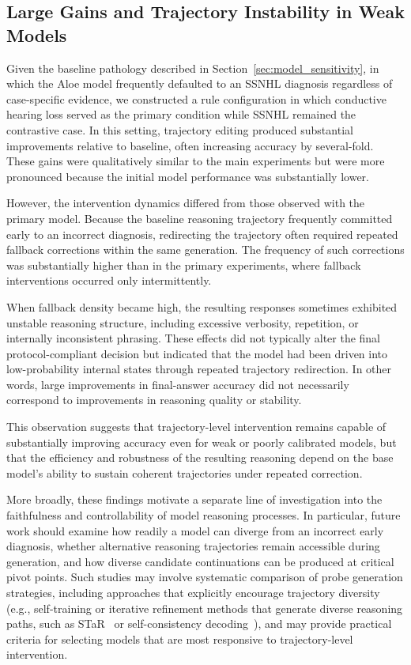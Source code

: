 \documentclass[twocolumn]{article}
\begin{document}
\subsection{Large Gains and Trajectory Instability in Weak
Models}\label{sec:trajectory_instability}

Given the baseline pathology described in Section~\ref{sec:model_sensitivity},
in which the Aloe model frequently defaulted to an SSNHL diagnosis regardless of
case-specific evidence, we constructed a rule configuration in which conductive
hearing loss served as the primary condition while SSNHL remained the
contrastive case. In this setting, trajectory editing produced substantial
improvements relative to baseline, often increasing accuracy by several-fold.
These gains were qualitatively similar to the main experiments but were more
pronounced because the initial model performance was substantially lower.

However, the intervention dynamics differed from those observed with the primary
model. Because the baseline reasoning trajectory frequently committed early to
an incorrect diagnosis, redirecting the trajectory often required repeated
fallback corrections within the same generation. The frequency of such
corrections was substantially higher than in the primary experiments, where
fallback interventions occurred only intermittently.

When fallback density became high, the resulting responses sometimes exhibited
unstable reasoning structure, including excessive verbosity, repetition, or
internally inconsistent phrasing. These effects did not typically alter the
final protocol-compliant decision but indicated that the model had been driven
into low-probability internal states through repeated trajectory redirection. In
other words, large improvements in final-answer accuracy did not necessarily
correspond to improvements in reasoning quality or stability.

This observation suggests that trajectory-level intervention remains capable of
substantially improving accuracy even for weak or poorly calibrated models, but
that the efficiency and robustness of the resulting reasoning depend on the base
model's ability to sustain coherent trajectories under repeated correction.

More broadly, these findings motivate a separate line of investigation into the
faithfulness and controllability of model reasoning processes. In particular,
future work should examine how readily a model can diverge from an incorrect
early diagnosis, whether alternative reasoning trajectories remain accessible
during generation, and how diverse candidate continuations can be produced at
critical pivot points. Such studies may involve systematic comparison of probe
generation strategies, including approaches that explicitly encourage trajectory
diversity (e.g., self-training or iterative refinement methods that generate
diverse reasoning paths, such as STaR~\parencite{zelikman2022star} or
self-consistency decoding~\parencite{wang2023selfconsistency}), and may provide
practical criteria for selecting models that are most responsive to
trajectory-level intervention.
\end{document}
